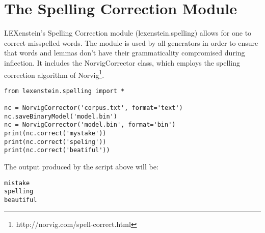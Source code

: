 \chapter{The Spelling Correction Module}
\label{spelling}

LEXenstein's Spelling Correction module (lexenstein.spelling) allows for one to correct misspelled words. The module is used by all generators in order to ensure that words and lemmas don't have their grammaticality compromised during inflection. It includes the NorvigCorrector class, which employs the spelling correction algorithm of Norvig\footnote{http://norvig.com/spell-correct.html}.

\begin{lstlisting}
from lexenstein.spelling import *

nc = NorvigCorrector('corpus.txt', format='text')
nc.saveBinaryModel('model.bin')
nc = NorvigCorrector('model.bin', format='bin')
print(nc.correct('mystake'))
print(nc.correct('speling'))
print(nc.correct('beatiful'))

\end{lstlisting}

The output produced by the script above will be:

\begin{lstlisting}
mistake
spelling
beautiful
\end{lstlisting}